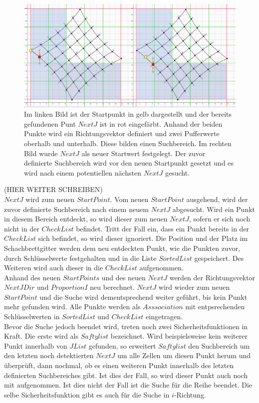 \begin{figure}[!htb]
	\centering
	\includegraphics[width=0.8\linewidth]{images/VerzeichnetesSchachbrett_4.png}
	\caption[Suche nach $NextJ$]{Im linken Bild ist der Startpunkt in gelb dargestellt und der bereits gefundenen Punt $NextJ$ ist in rot eingefärbt. Anhand der beiden Punkte wird ein Richtungsvektor definiert und zwei Pufferwerte oberhalb und unterhalb. Diese bilden einen Suchbereich. Im rechten Bild wurde $NextJ$ als neuer Startwert festgelegt. Der zuvor definierte Suchbereich wird vor den neuen Startpunkt gesetzt und es wird nach einem potentiellen nächsten $NextJ$ gesucht.}
	\label{fig:IListJList}
\end{figure}

(HIER WEITER SCHREIBEN)\\
$NextJ$ wird zum neuen $StartPoint$. Vom neuen $StartPoint$ ausgehend, wird der zuvor definierte Suchbereich nach einem neuem $NextJ$ abgesucht. Wird ein Punkt in diesem Bereich entdeckt, so wird dieser zum neuen $NextJ$, sofern er sich noch nicht in der $CheckList$ befindet. Tritt der Fall ein, dass ein Punkt bereits in der $CheckList$ sich befindet, so wird dieser ignoriert. Die Position und der Platz im Schachbrettgitter werden dem neu entdeckten Punkt, wie die Punkten zuvor, durch Schlüsselwerte festgehalten und in die Liste $SortedList$ gespeichert. Des Weiteren wird auch dieser in die $CheckList$ aufgenommen.\\

Anhand des neuen $StartPoints$ und des neuen $NextJ$ werden der Richtungsvektor $NextJDir$ und $ProportionI$ neu berechnet. $NextJ$ wird wieder zum neuen $StartPoint$ und die Suche wird dementsprechend weiter geführt, bis kein Punkt mehr gefunden wird. Alle Punkte werden als $Asssociation$ mit entpsrechenden Schlüsselwerten in $SortedList$ und $CheckList$ eingetragen.\\

Bevor die Suche jedoch beendet wird, treten noch zwei Sicherheitsfunktionen in Kraft. Die erste wird als $Saftylist$ bezeichnet. Wird beispielsweise kein weiterer Punkt innerhalb von $JList$ gefunden, so erweitert $Saftylist$ den Suchbereich um den letzten noch detektierten $NextJ$ um alle Zellen um diesen Punkt herum und überprüft, dann nochmal, ob es einen weiteren Punkt innerhalb des letzten definierten Suchbereiches gibt. Ist dies der Fall, so wird dieser Punkt auch noch mit aufgenommen. Ist dies nicht der Fall ist die Suche für die Reihe beendet. Die selbe Sicherheitsfunktion gibt es auch für die Suche in $i$-Richtung.\\

